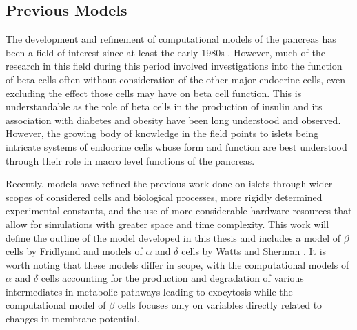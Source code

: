 \subsection{Previous Models}
The development and refinement of computational models of the pancreas has been a field of interest since at least the early 1980s \cite{chay_minimal_1983}. However, much of the research in this field during this period involved investigations into the function of beta cells often without consideration of the other major endocrine cells, even excluding the effect those cells may have on beta cell function. This is understandable as the role of beta cells in the production of insulin and its association with diabetes and obesity have been long understood and observed. However, the growing body of knowledge in the field points to islets being intricate systems of endocrine cells whose form and function are best understood through their role in macro level functions of the pancreas.
\par Recently, models have refined the previous work done on islets through wider scopes of considered cells and biological processes, more rigidly determined experimental constants, and the use of more considerable hardware resources that allow for simulations with greater space and time complexity. This work will define the outline of the model developed in this thesis and includes a model of $\beta$ cells by Fridlyand and models of $\alpha$ and $\delta$ cells by Watts and Sherman \cite{fridlyand_pancreatic_2016} \cite{watts_modeling_2014}. It is worth noting that these models differ in scope, with the computational models of $\alpha$ and $\delta$ cells accounting for the production and degradation of various intermediates in metabolic pathways leading to exocytosis while the computational model of $\beta$ cells focuses only on variables directly related to changes in membrane potential.